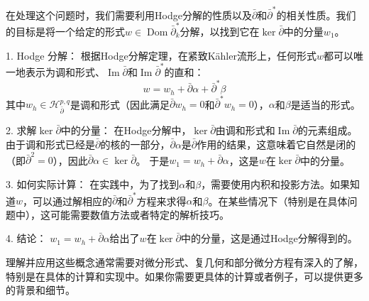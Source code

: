\documentclass[lang=cn,zihao=-4,a4paper,fontset=none]{beautybook}
\begin{document}
\begin{solution}
    在处理这个问题时，我们需要利用Hodge分解的性质以及$\bar{\partial}$和$\bar{\partial}^*$的相关性质。我们的目标是将一个给定的形式$w \in \operatorname{Dom} \bar{\partial}^*_k$分解，以找到它在$\ker \bar{\partial}$中的分量$w_1$。

1. Hodge 分解：
    根据Hodge分解定理，在紧致Kähler流形上，任何形式$w$都可以唯一地表示为调和形式、$\operatorname{Im} \bar{\partial}$和$\operatorname{Im} \bar{\partial}^*$的直和：
     $$
     w = w_h + \bar{\partial} \alpha + \bar{\partial}^* \beta
     $$
   其中$w_h \in \mathcal{H}_{\bar{\partial}}^{p,q}$是调和形式（因此满足$\bar{\partial} w_h = 0$和$\bar{\partial}^* w_h = 0$），$\alpha$和$\beta$是适当的形式。

2. 求解$\ker \bar{\partial}$中的分量：
    在Hodge分解中，$\ker \bar{\partial}$由调和形式和$\operatorname{Im} \bar{\partial}$的元素组成。由于调和形式已经是$\bar{\partial}$的核的一部分，$\bar{\partial} \alpha$是$\bar{\partial}$作用的结果，这意味着它自然是闭的（即$\bar{\partial}^2 = 0$），因此$\bar{\partial} \alpha \in \ker \bar{\partial}$。
    于是$w_1 = w_h + \bar{\partial} \alpha$，这是$w$在$\ker \bar{\partial}$中的分量。

3. 如何实际计算：
    在实践中，为了找到$\alpha$和$\beta$，需要使用内积和投影方法。如果知道$w$，可以通过解相应的$\bar{\partial}$和$\bar{\partial}^*$方程来求得$\alpha$和$\beta$。在某些情况下（特别是在具体问题中），这可能需要数值方法或者特定的解析技巧。

4. 结论：
    $w_1 = w_h + \bar{\partial} \alpha$给出了$w$在$\ker \bar{\partial}$中的分量，这是通过Hodge分解得到的。

理解并应用这些概念通常需要对微分形式、复几何和部分微分方程有深入的了解，特别是在具体的计算和实现中。如果你需要更具体的计算或者例子，可以提供更多的背景和细节。
\end{solution}
    



{\normalem
\printbibliography[
heading=bibintoc,
title={参考文献}
]
\printindex
\thispagestyle{empty}}
\ISBNcode{\EANisbn[ISBN=978-80-7340-097-2]} %
\makebottomcover
\end{document}
